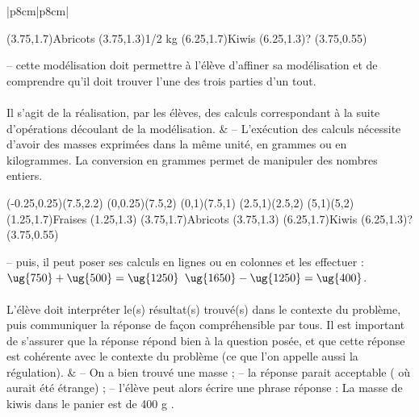 {\begin{longtable}{|p{8cm}|p{8cm}|}
\begin{pspicture}
      \rput(3.75,1.7){Abricots}
      \rput(3.75,1.3){1/2 kg}
      \rput(6.25,1.7){Kiwis}
      \rput(6.25,1.3){?}
      \rput(3.75,0.55){}
   \end{pspicture} \newline
   --  cette modélisation doit permettre à l'élève d'affiner sa modélisation et de comprendre qu'il doit trouver l'une des trois parties d'un tout. \\
   \hline
    \\
   \hline
   Il s’agit de la réalisation, par les élèves, des calculs correspondant à la suite d’opérations découlant de la modélisation.
   &
   -- L’exécution des calculs nécessite d’avoir des masses exprimées dans la même unité, en grammes ou en kilogrammes. La conversion en grammes permet de manipuler des nombres entiers. \newline
   \begin{pspicture}(-0.25,0.25)(7.5,2.2)
      \psframe(0,0.25)(7.5,2)
      \psline(0,1)(7.5,1)
      \psline(2.5,1)(2.5,2)
      \psline(5,1)(5,2)
      \rput(1.25,1.7){Fraises}
      \rput(1.25,1.3){}
      \rput(3.75,1.7){Abricots}
      \rput(3.75,1.3){}
      \rput(6.25,1.7){Kiwis}
      \rput(6.25,1.3){?}
      \rput(3.75,0.55){}
   \end{pspicture} \newline
   -- puis, il peut poser ses calculs en lignes ou en colonnes et les effectuer : \newline
   $\ug{750}+\ug{500} =\ug{1250}$ \newline
   $\ug{1650}-\ug{1250} =\ug{400}$. \\
   \hline
    \\
   \hline
   L'élève doit interpréter le(s) résultat(s) trouvé(s) dans le contexte du problème, puis communiquer la réponse de façon compréhensible par tous. \newline
   Il est important de s’assurer que la réponse répond bien à la question posée,  et que cette réponse est cohérente avec le contexte du problème (ce que l'on appelle aussi la régulation).
   &
   -- On a bien trouvé une masse ; \newline
   -- la réponse parait acceptable ( où  aurait été étrange) ; \newline
   -- l'élève peut alors écrire une phrase réponse : \newline
   \og La masse de kiwis dans le panier est de 400 g \fg. \\
   \hline
\end{longtable}}

